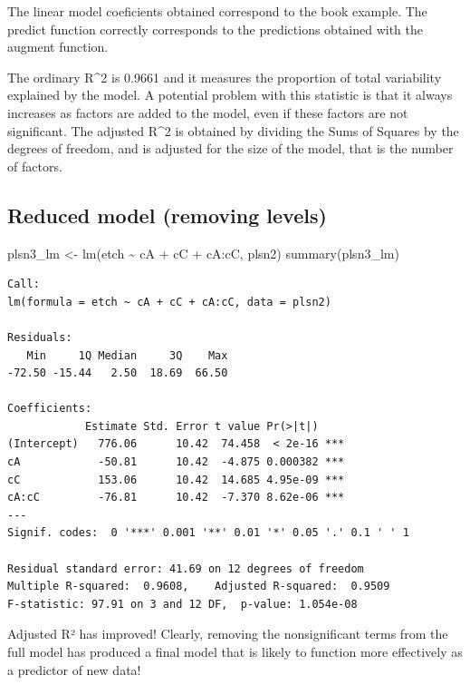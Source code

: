 \documentclass[
]{book}
\newenvironment{Shaded}{\begin{snugshade}}{\end{snugshade}}
\newcommand{\FunctionTok}[1]{\textcolor[rgb]{0.00,0.00,0.00}{#1}}
\newcommand{\NormalTok}[1]{#1}
\newcommand{\OtherTok}[1]{\textcolor[rgb]{0.56,0.35,0.01}{#1}}
\newcommand{\SpecialCharTok}[1]{\textcolor[rgb]{0.00,0.00,0.00}{#1}}
\begin{document}
The linear model coeficients obtained correspond to the book example.
The predict function correctly corresponds to the predictions obtained with the augment function.

The ordinary R\^{}2 is 0.9661 and it measures the proportion of total variability explained by the model. A potential problem with this statistic is that it always increases as factors are added to the model, even if these factors are not significant. The adjusted R\^{}2 is obtained by dividing the Sums of Squares by the degrees of freedom, and is adjusted for the size of the model, that is the number of factors.

\hypertarget{reduced-model-removing-levels}{%
\subsection{Reduced model (removing levels)}\label{reduced-model-removing-levels}}

\begin{Shaded}
\begin{Highlighting}[]
\NormalTok{plsn3\_lm }\OtherTok{\textless{}{-}} \FunctionTok{lm}\NormalTok{(etch }\SpecialCharTok{\textasciitilde{}}\NormalTok{ cA }\SpecialCharTok{+}\NormalTok{ cC }\SpecialCharTok{+}\NormalTok{ cA}\SpecialCharTok{:}\NormalTok{cC, plsn2)}
\FunctionTok{summary}\NormalTok{(plsn3\_lm)}
\end{Highlighting}
\end{Shaded}

\begin{verbatim}
Call:
lm(formula = etch ~ cA + cC + cA:cC, data = plsn2)

Residuals:
   Min     1Q Median     3Q    Max 
-72.50 -15.44   2.50  18.69  66.50 

Coefficients:
            Estimate Std. Error t value Pr(>|t|)    
(Intercept)   776.06      10.42  74.458  < 2e-16 ***
cA            -50.81      10.42  -4.875 0.000382 ***
cC            153.06      10.42  14.685 4.95e-09 ***
cA:cC         -76.81      10.42  -7.370 8.62e-06 ***
---
Signif. codes:  0 '***' 0.001 '**' 0.01 '*' 0.05 '.' 0.1 ' ' 1

Residual standard error: 41.69 on 12 degrees of freedom
Multiple R-squared:  0.9608,	Adjusted R-squared:  0.9509 
F-statistic: 97.91 on 3 and 12 DF,  p-value: 1.054e-08
\end{verbatim}

Adjusted R² has improved! Clearly, removing the nonsignificant terms from the full model has produced a final model that is likely to function more effectively as a predictor of new data!
\end{document}
